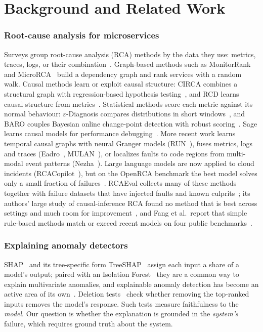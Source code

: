 \documentclass[conference]{IEEEtran}
\begin{document}
\section{Background and Related Work}

\subsubsection{Root-cause analysis for microservices}
Surveys group root-cause analysis (RCA) methods by the data they use: metrics,
traces, logs, or their combination~\cite{soldani2022survey}. Graph-based methods
such as MonitorRank~\cite{kim2013monitorrank} and MicroRCA~\cite{wu2020microrca}
build a dependency graph and rank services with a random walk. Causal methods learn
or exploit causal structure: CIRCA combines a structural graph with
regression-based hypothesis testing~\cite{li2022circa}, and RCD learns causal
structure from metrics~\cite{ikram2022rcd}. Statistical methods score each metric
against its normal behaviour: $\varepsilon$-Diagnosis compares distributions in
short windows~\cite{shan2019ediagnosis}, and BARO couples Bayesian online
change-point detection with robust scoring~\cite{pham2024baro}. Sage learns causal
models for performance debugging~\cite{gan2021sage}. More recent work learns
temporal causal graphs with neural Granger models (RUN~\cite{lin2024run}), fuses
metrics, logs and traces (Eadro~\cite{lee2023eadro}, MULAN~\cite{zheng2024mulan}),
or localizes faults to code regions from multi-modal event patterns
(Nezha~\cite{yu2023nezha}). Large language models are now applied to cloud
incidents (RCACopilot~\cite{chen2024rcacopilot}), but on the OpenRCA benchmark the
best model solves only a small fraction of failures~\cite{xu2025openrca}. RCAEval
collects many of these methods together with failure datasets that have injected
faults and known culprits~\cite{pham2025rcaeval}; its authors' large study of
causal-inference RCA found no method that is best across settings and much room
for improvement~\cite{pham2024causal}, and Fang et al.\ report that simple
rule-based methods match or exceed recent models on four public
benchmarks~\cite{fang2026rethinking}.

\subsubsection{Explaining anomaly detectors}
SHAP~\cite{lundberg2017shap} and its tree-specific form
TreeSHAP~\cite{lundberg2020tree} assign each input a share of a model's output;
paired with an Isolation Forest~\cite{liu2008iforest} they are a common way to
explain multivariate anomalies, and explainable anomaly detection has become an
active area of its own~\cite{li2023xadsurvey}. Deletion tests~\cite{samek2017evaluating} check
whether removing the top-ranked inputs removes the model's response. Such tests
measure faithfulness to the \emph{model}. Our question is whether the explanation
is grounded in the \emph{system's} failure, which requires ground truth about the
system.
\end{document}
